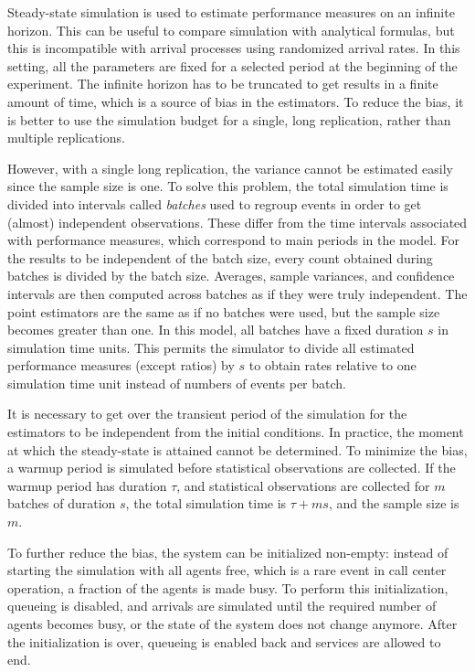 Steady-state simulation is used to estimate performance measures on an
infinite horizon.  This can be useful to compare simulation with
analytical formulas, but this is incompatible with arrival processes
using randomized arrival rates.  In this setting,
all the parameters are fixed for a selected period at the
beginning of the experiment.
The infinite horizon has to be truncated
to get results in a finite amount of
time, which is a source of
bias in the estimators.  To reduce the bias, it is better to use the
simulation budget for a single, long replication, rather than multiple
replications.

However, with a single long replication, the variance
cannot be estimated easily
since the sample size is one.  To solve this
problem, the total simulation time is divided into intervals called
\emph{batches} used to regroup events in order to
get (almost) independent observations.
These differ from the time intervals associated with performance
measures, which correspond to main periods in the model.
For the results to be independent of the batch size, every count
obtained during batches is divided by the batch size.
Averages, sample variances, and confidence
intervals are then computed across batches as if they were truly
independent.  The point estimators are the
same as if no batches were used, but the sample size becomes greater
than one.
In this model, all batches have
a fixed duration $s$ in simulation time units.
This permits the simulator to divide all estimated performance
measures (except ratios) by $s$ to obtain rates relative to one
simulation time unit instead of numbers of events per batch.

It is necessary to get over the
transient period of the simulation for the estimators to be
independent from the initial conditions.  In practice, the moment at which
the steady-state is attained cannot be determined.  To minimize the bias, a
warmup period is simulated before statistical observations are
collected.  If the warmup period has duration $\tau$, and
statistical observations are collected for $m$ batches of duration
$s$, the total simulation time is $\tau + ms$, and the sample size is $m$.

To further reduce the bias, the system can be initialized non-empty:
instead of starting the simulation with all agents free, which is a
rare event in call center operation, a fraction of the agents is made
busy.  To perform this initialization, queueing is disabled, and
arrivals are simulated until the required number of agents becomes
busy, or the state of the system does not change anymore.
After the initialization is over, queueing is enabled back and
services are allowed to end.

